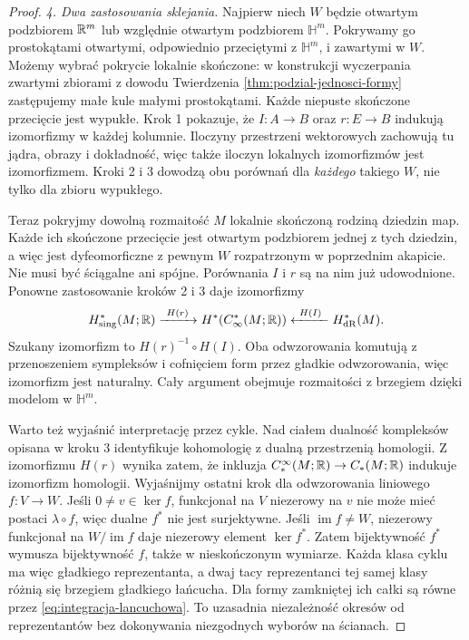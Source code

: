 \begin{proof}
\emph{4. Dwa zastosowania sklejania.}
Najpierw niech $W$ będzie otwartym podzbiorem $\mathbb{R}^m$
lub względnie otwartym podzbiorem $\mathbb H^m$.
Pokrywamy go prostokątami otwartymi, odpowiednio
przeciętymi z $\mathbb H^m$, i zawartymi w $W$.
Możemy wybrać pokrycie lokalnie skończone: w konstrukcji
wyczerpania zwartymi zbiorami z dowodu Twierdzenia
\ref{thm:podzial-jednosci-formy} zastępujemy małe kule
małymi prostokątami. Każde niepuste skończone przecięcie
jest wypukłe. Krok 1 pokazuje, że $I:A\to B$ oraz
$r:E\to B$ indukują izomorfizmy w każdej kolumnie.
Iloczyny przestrzeni wektorowych zachowują tu jądra,
obrazy i dokładność, więc także iloczyn lokalnych
izomorfizmów jest izomorfizmem. Kroki 2 i 3 dowodzą
obu porównań dla \emph{każdego} takiego $W$, nie tylko
dla zbioru wypukłego.

Teraz pokryjmy dowolną rozmaitość $M$ lokalnie skończoną
rodziną dziedzin map. Każde ich skończone przecięcie
jest otwartym podzbiorem jednej z tych dziedzin,
a więc jest dyfeomorficzne z pewnym $W$ rozpatrzonym
w poprzednim akapicie. Nie musi być ściągalne ani spójne.
Porównania $I$ i $r$ są na nim już udowodnione.
Ponowne zastosowanie kroków 2 i 3 daje izomorfizmy
\[
 H^*_{\mathrm{sing}}(M;\mathbb{R})
 \xrightarrow{\ H(r)\ }H^*(C_\infty^*(M;\mathbb{R}))
 \xleftarrow{\ H(I)\ }H^*_{\mathrm{dR}}(M).
\]
Szukany izomorfizm to $H(r)^{-1}\circ H(I)$.
Oba odwzorowania komutują z przenoszeniem sympleksów
i cofnięciem form przez gładkie odwzorowania, więc
izomorfizm jest naturalny. Cały argument obejmuje
rozmaitości z brzegiem dzięki modelom w $\mathbb H^m$.

Warto też wyjaśnić interpretację przez cykle. Nad ciałem
dualność kompleksów opisana w kroku 3 identyfikuje
kohomologię z dualną przestrzenią homologii.
Z izomorfizmu $H(r)$ wynika zatem, że inkluzja
$C_*^\infty(M;\mathbb{R})\to C_*(M;\mathbb{R})$ indukuje izomorfizm
homologii. Wyjaśnijmy ostatni krok dla odwzorowania
liniowego $f:V\to W$. Jeśli $0\ne v\in\ker f$,
funkcjonał na $V$ niezerowy na $v$ nie może mieć
postaci $\lambda\circ f$, więc dualne $f^*$ nie jest
surjektywne. Jeśli $\operatorname{im}f\ne W$,
niezerowy funkcjonał na $W/\operatorname{im}f$ daje
niezerowy element $\ker f^*$. Zatem bijektywność
$f^*$ wymusza bijektywność $f$, także w nieskończonym wymiarze.
Każda klasa cyklu ma więc gładkiego reprezentanta,
a dwaj tacy reprezentanci tej samej klasy różnią się
brzegiem gładkiego łańcucha. Dla formy zamkniętej ich
całki są równe przez \eqref{eq:integracja-lancuchowa}.
To uzasadnia niezależność okresów od reprezentantów
bez dokonywania niezgodnych wyborów na ścianach.
\end{proof}

